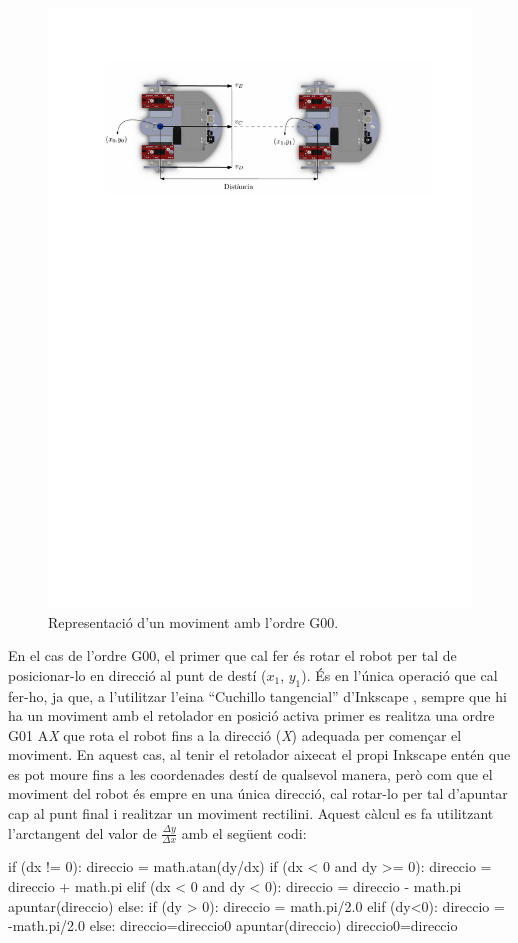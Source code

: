 \begin{figure}[H]
	\centering
	\includegraphics[scale=0.9]{G00}
	\caption{Representació d'un moviment amb l'ordre G00.}
	\label{fig:G00}
\end{figure}


En el cas de l’ordre G00, el primer que cal fer és rotar el robot per tal de posicionar-lo en direcció al punt de destí ($x_{1}$, $y_{1}$). És en l'única operació que cal fer-ho, ja que, a l'utilitzar l’eina “Cuchillo tangencial” d’Inkscape , sempre que hi ha un moviment amb el retolador en posició activa primer es realitza una ordre G01 A\emph{X} que rota el robot fins a la direcció (\emph{X}) adequada per començar el moviment. En aquest cas, al tenir el retolador aixecat el propi Inkscape entén que es pot moure fins a les coordenades destí de qualsevol manera, però com que el moviment del robot és empre en una única direcció, cal rotar-lo per tal d'apuntar cap al punt final i realitzar un moviment rectilini. Aquest càlcul es fa utilitzant l’arctangent del valor de $\frac{\Delta y }{\Delta x}$ amb el següent codi:
\begin{python}
	if (dx != 0):
	direccio = math.atan(dy/dx) 
	if (dx < 0 and dy >= 0):
	direccio = direccio + math.pi 
	elif (dx < 0 and dy < 0):
	direccio = direccio - math.pi
	apuntar(direccio) 
	else:
	if (dy > 0):
	direccio = math.pi/2.0 
	elif (dy<0):
	direccio = -math.pi/2.0 
	else:
	direccio=direccio0
	apuntar(direccio) 
	direccio0=direccio
\end{python}

